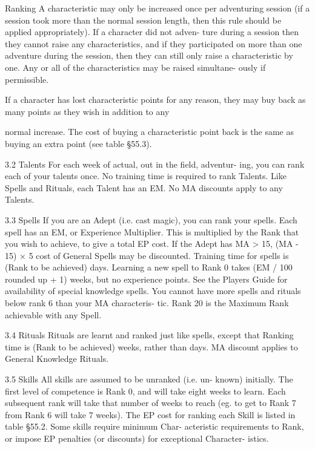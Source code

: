\begin{Chapter}{Ranking}
A  characteristic  may  only  be  increased  once  per 
adventuring  session  (if  a  session  took  more  than 
the normal session length, then this rule should be 
applied appropriately). If a character did not adven-
ture  during  a  session  then  they  cannot  raise  any 
characteristics,  and  if  they  participated  on  more 
than  one  adventure  during  the  session,  then  they 
can  still  only  raise  a  characteristic  by  one.  Any  or 
all  of  the  characteristics  may  be  raised  simultane-
ously if permissible. 

If  a  character  has  lost  characteristic points  for  any 
reason, they may buy back as many points as they 
wish in addition to any 

normal increase. The cost of buying a characteristic 
point back is the same as buying an extra point (see 
table §55.3). 

3.2 Talents 
For each week of actual, out in the field, adventur-
ing,  you  can  rank  each  of  your  talents  once.  No 
training  time  is  required  to  rank  Talents.  Like 
Spells and Rituals, each Talent has an EM. No MA 
discounts apply to any Talents. 

3.3 Spells 
If you are an Adept (i.e. cast magic), you can rank 
your  spells.  Each  spell  has  an  EM,  or  Experience 
Multiplier. This is multiplied by the Rank that you 
wish  to  achieve,  to  give  a  total  EP  cost.  If  the 
Adept  has  MA  >  15,  (MA  -  15)  ×  5%
cost of General Spells may be discounted. Training 
time  for  spells  is  (Rank  to  be  achieved)  days. 
Learning  a  new  spell  to  Rank  0  takes  (EM  /  100 
rounded  up  +  1)  weeks,  but  no  experience  points. 
See  the  Players  Guide  for  availability  of  special 
knowledge  spells.  You  cannot  have  more  spells 
and rituals below rank 6 than your MA characteris-
tic. Rank 20 is the Maximum Rank achievable with 
any Spell. 

3.4 Rituals 
Rituals are learnt and ranked just like spells, except 
that Ranking time is (Rank to be achieved)  weeks, 
rather  than  days.  MA  discount  applies  to  General 
Knowledge Rituals. 

3.5 Skills 
All  skills  are  assumed  to  be  unranked  (i.e.  un-
known)  initially.  The  first  level  of  competence  is 
Rank  0,  and  will  take  eight  weeks  to  learn.  Each 
subsequent rank will take that number of weeks to 
reach (eg. to get to Rank 7 from Rank 6 will take 7 
weeks). The EP cost for ranking each Skill is listed 
in table §55.2. Some skills require minimum Char-
acteristic  requirements  to  Rank,  or  impose  EP 
penalties  (or  discounts)  for  exceptional  Character-
istics. 


\end{Chapter}
